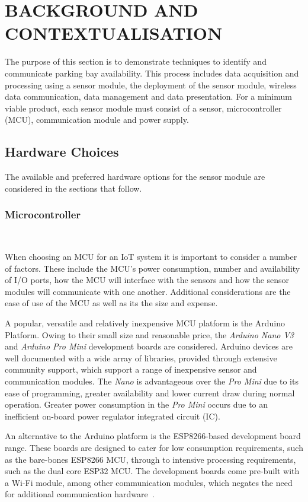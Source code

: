 \documentclass[10pt,twocolumn]{witseiepaper}
\begin{document}
\vspace{1em}
\section{BACKGROUND AND CONTEXTUALISATION}
	The purpose of this section is to demonstrate techniques to identify and communicate parking bay availability. This process includes data acquisition and processing using a sensor module, the deployment of the sensor module, wireless data communication, data management and data presentation. For a minimum viable product, each sensor module must consist of a sensor, microcontroller (MCU), communication module and power supply.

	\subsection{Hardware Choices} 
	
		The available and preferred hardware options for the sensor module are considered in the sections that follow.
	
		\subsubsection{Microcontroller} $   $
		
			When choosing an MCU for an IoT system it is important to consider a number of factors. These include the MCU's power consumption, number and availability of I/O ports, how the MCU will interface with the sensors and how the sensor modules will communicate with one another. Additional considerations are the ease of use of the MCU as well as its the size and expense.
			
			A popular, versatile and relatively inexpensive MCU platform is the Arduino Platform. Owing to their small size and reasonable price, the \textit{Arduino Nano V3} and \textit{Arduino Pro Mini} development boards are considered. Arduino devices are well documented with a wide array of libraries, provided through extensive community support, which support a range of inexpensive sensor and communication modules. The \textit{Nano} is advantageous over the \textit{Pro Mini} due to its ease of programming, greater availability and lower current draw during normal operation. Greater power consumption in the \textit{Pro Mini} occurs due to an inefficient on-board power regulator integrated circuit (IC).

			An alternative to the Arduino platform is the ESP8266-based development board range. 
			These boards are designed to cater for low consumption requirements, such as the bare-bones ESP8266 MCU, through to intensive processing requirements, such as the dual core ESP32 MCU. The development boards come pre-built with a \mbox{Wi-Fi} module, among other communication modules, which negates the need for additional communication hardware~\cite{esp12e}.
			
\end{document}
